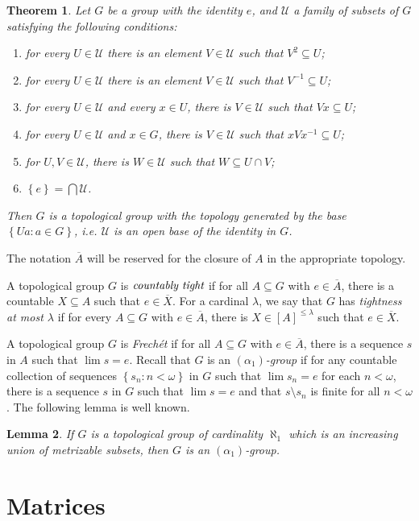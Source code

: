 \documentclass{amsart}
\theoremstyle{plain}
\newtheorem{theorem}{Theorem}[section]
\newtheorem{lemma}[theorem]{Lemma}
\theoremstyle{definition}
\numberwithin{equation}{section}
\renewcommand{\a}{\alpha}
\renewcommand{\o}{\omega}
\renewcommand{\l}{\lambda}
\newcommand{\sst}{\subseteq}
\newcommand{\cu}{\mathcal U}
\newcommand{\set}[1]{\left\{#1\right\}}
\begin{document}
\begin{theorem}\label{t:osnovna}
	Let $G$ be a group with the identity $e$, and $\cu$ a family of subsets of $G$ satisfying the following conditions:
	\begin{enumerate}
		\item for every $U\in\cu$ there is an element $V\in\cu$ such that $V^2\sst U$;
		\item for every $U\in\cu$ there is an element $V\in\cu$ such that $V^{-1}\sst U$;
		\item for every $U\in\cu$ and every $x\in U$, there is $V\in\cu$ such that $Vx\sst U$;
		\item for every $U\in\cu$ and $x\in G$, there is $V\in\cu$ such that $xVx^{-1}\sst U$;
		\item for $U,V\in\cu$, there is $W\in\cu$ such that $W\sst U\cap V$;
		\item $\set{e}=\bigcap \cu$.
	\end{enumerate}
	Then $G$ is a topological group with the topology generated by the base $\set{Ua:a\in G}$, i.e. $\cu$ is an open base of the identity in $G$.
\end{theorem}

The notation $\overline{A}$ will be reserved for the closure of $A$ in the appropriate topology.

A topological group $G$ is $\emph{countably tight}$ if for all $A\sst G$ with $e\in\overline{A}$, there is a countable $X\sst A$ such that $e\in \overline{X}$.
For a cardinal $\l$, we say that $G$ has \emph{tightness at most $\l$} if for every $A\sst G$ with $e\in \overline{A}$, there is $X\in [A]^{\le\l}$ such that $e\in\overline{X}$.

A topological group $G$ is \emph{Frech\'et} if for all $A\sst G$ with $e\in \overline{A}$, there is a sequence $s$ in $A$ such that $\lim s=e$.
Recall that $G$ is an \emph{$(\a_1)$-group} if for any countable collection of sequences $\set{s_n:n<\o}$ in $G$ such that $\lim s_n=e$ for each $n<\o$, there is a sequence $s$ in $G$ such that $\lim s=e$ and that $s\setminus s_n$ is finite for all $n<\o$.
The following lemma is well known.

\begin{lemma}\label{l:alpha_1}
	If $G$ is a topological group of cardinality $\aleph_1$ which is an increasing union of metrizable subsets, then $G$ is an $(\a_1)$-group.
\end{lemma}


\section{Matrices}\label{s:general}
\end{document}
